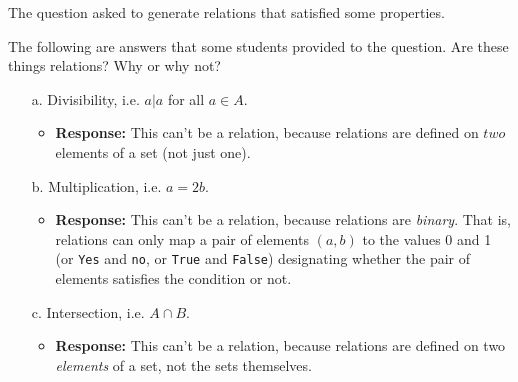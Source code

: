 \documentclass[10pt]{beamer}
\begin{document}
\begin{frame}
The question asked to generate relations that satisfied some properties.

\vfill 
\begin{myyellowbox}[title=Poll]
The following are answers that some students provided to the question.  Are these things relations? Why or why not?

\begin{itemize}
	\item[a.] Divisibility, i.e. $a|a$ for all $a \in A$. \pause 
	\begin{itemize}
	\item  \textbf{Response:} This can't be a relation, because relations are defined on $\textit{two}$ elements of a set (not just one).
	\end{itemize}

	\item[b.] Multiplication, i.e. $a=2b$.  \pause 
	\begin{itemize}
	\item  \textbf{Response:} This can't be a relation, because relations are \textit{binary}.  That is, relations can only map a pair of elements $(a,b)$ to the values 0 and 1 (or \texttt{Yes} and \texttt{no}, or \texttt{True} and \texttt{False}) designating whether the pair of elements satisfies the condition or not.   
	\end{itemize}
	
		\item[c.] Intersection, i.e. $A \cap B$. \pause 
	\begin{itemize}
	\item  \textbf{Response:} This can't be a relation, because relations are defined on two \textit{elements} of a set, not the sets themselves.  
	\end{itemize}
	
\end{itemize}
\end{myyellowbox} 


\end{frame}
\end{document}

